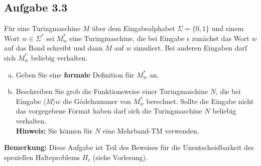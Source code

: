 \subsection*{Aufgabe 3.3}
Für eine Turingmaschine $M$ über dem Eingabealphabet $\Sigma = \{0,1\}$ und einem Wort $w \in \Sigma^*$ sei $M_w^*$ eine Turingmaschine, die bei Eingabe $\epsilon$ zunächst das Wort $w$ auf das Band schreibt und dann $M$ auf $w$ simuliert. Bei anderen Eingaben darf sich $M_w^*$ beliebig verhalten.
\begin{enumerate}[(a)]
	\item Geben Sie eine \textbf{formale} Definition für $M_w^*$ an.
	\item Beschreiben Sie grob die Funktionsweise einer Turingmaschine $N$, die bei Eingabe $\langle M \rangle w$ die Gödelnummer von $M_w^*$ berechnet. Sollte die Eingabe nicht das vorgegebene Format haben darf sich die Turingmaschine $N$ beliebig verhalten.\\
	\textbf{Hinweis:} Sie können für $N$  eine Mehrband-TM verwenden.
\end{enumerate}
\textbf{Bemerkung:} Diese Aufgabe ist Teil des Beweises für die Unentscheidbarkeit des speziellen Halteproblems $H_\epsilon$ (siehe Vorlesung).